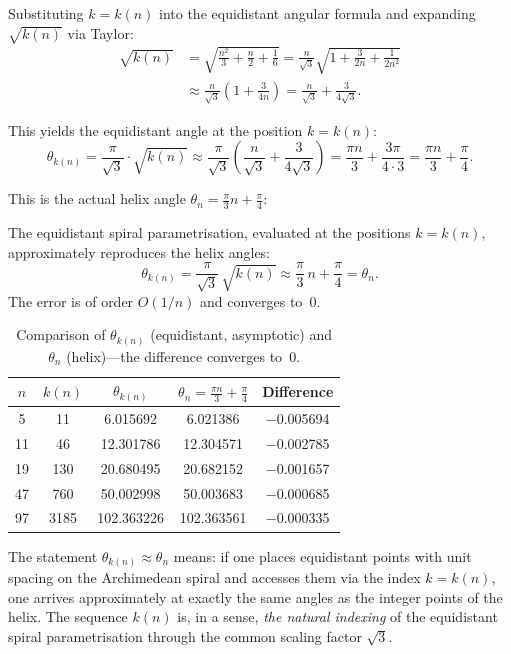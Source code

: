 Substituting $k = k(n)$ into the equidistant angular formula and
expanding $\sqrt{k(n)}$ via Taylor:
\begin{align*}
  \sqrt{k(n)}
  &= \sqrt{\frac{n^2}{3} + \frac{n}{2} + \frac{1}{6}}
   = \frac{n}{\sqrt{3}}\sqrt{1 + \frac{3}{2n} + \frac{1}{2n^2}} \\
  &\approx \frac{n}{\sqrt{3}}\!\left(1 + \frac{3}{4n}\right)
   = \frac{n}{\sqrt{3}} + \frac{3}{4\sqrt{3}}.
\end{align*}

This yields the equidistant angle at the position $k = k(n)$:
\[
  \theta_{k(n)}
  = \frac{\pi}{\sqrt{3}}\cdot\sqrt{k(n)}
  \approx \frac{\pi}{\sqrt{3}}\!\left(\frac{n}{\sqrt{3}} + \frac{3}{4\sqrt{3}}\right)
  = \frac{\pi n}{3} + \frac{3\pi}{4 \cdot 3}
  = \frac{\pi n}{3} + \frac{\pi}{4}.
\]

This is the actual helix angle $\theta_n = \tfrac{\pi}{3}n + \tfrac{\pi}{4}$:

\begin{satz}\label{satz:sqrt3}
The equidistant spiral parametrisation, evaluated at the
positions $k = k(n)$, approximately reproduces the helix angles:
\[
  \theta_{k(n)}
  = \frac{\pi}{\sqrt{3}}\,\sqrt{k(n)}
  \approx \frac{\pi}{3}\,n + \frac{\pi}{4}
  = \theta_n.
\]
The error is of order $O(1/n)$ and converges to~$0$.
\end{satz}

\begin{table}[H]
\centering
\renewcommand{\arraystretch}{1.2}
\caption{Comparison of $\theta_{k(n)}$ (equidistant, asymptotic) and $\theta_n$ (helix)---the difference converges to~$0$.}
\begin{tabular}{ccccc}
\toprule
$n$ & $k(n)$ & $\theta_{k(n)}$ & $\theta_n = \frac{\pi n}{3}+\frac{\pi}{4}$ & Difference \\
\midrule
 5  &  11  &  6.015692 &  6.021386 & $-$0.005694 \\
11  &  46  & 12.301786 & 12.304571 & $-$0.002785 \\
19  & 130  & 20.680495 & 20.682152 & $-$0.001657 \\
47  & 760  & 50.002998 & 50.003683 & $-$0.000685 \\
97  & 3185 & 102.363226 & 102.363561 & $-$0.000335 \\
\bottomrule
\end{tabular}
\end{table}

\begin{bemerkung}
The statement $\theta_{k(n)} \approx \theta_n$ means: if one places
equidistant points with unit spacing on the Archimedean spiral
and accesses them via the index $k = k(n)$, one arrives approximately
at exactly the same angles as the integer points of the helix.
The sequence $k(n)$ is, in a sense, \emph{the natural indexing}
of the equidistant spiral parametrisation through the common
scaling factor $\sqrt{3}$.
\end{bemerkung}

